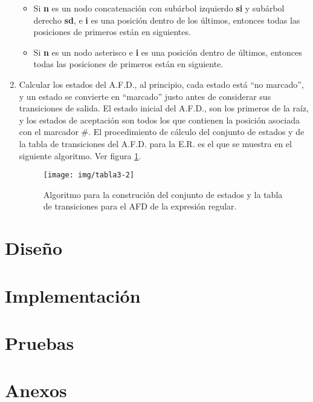 \documentclass{report}
\begin{document}
\begin{enumerate}
	\begin{itemize}
		\item Si {\bf n} es un nodo concatenación con subárbol izquierdo {\bf si} y subárbol derecho {\bf sd}, e {\bf i} es una posición dentro de los últimos, entonces todas las posiciones de primeros están en siguientes.
		\item Si  {\bf n} es un nodo asterisco e {\bf i} es una posición dentro de últimos, entonces todas las posiciones de primeros están en siguiente.
	\end{itemize}

	\item Calcular los estados del A.F.D., al principio, cada estado está “no marcado”, y un estado se convierte en “marcado” justo antes de considerar sus transiciones de salida. El estado inicial del A.F.D., son los primeros de la raíz, y los estados de aceptación son todos los que contienen la posición asociada con el marcador \#. El procedimiento de cálculo del conjunto de estados y de la tabla de transiciones del A.F.D. para la E.R. es el que se muestra en el siguiente algoritmo. Ver figura \ref{fig:algoritmo}.

	\begin{figure}
		\centering
		\texttt{[image: img/tabla3-2]}
		\caption{Algoritmo para la construción del conjunto de estados y la tabla de transiciones para el AFD de la expresión regular.}
		\label{fig:algoritmo}
	\end{figure}

\end{enumerate}




\chapter{Diseño}


\chapter{Implementación}


\chapter{Pruebas}


\chapter{Anexos}
\end{document}
